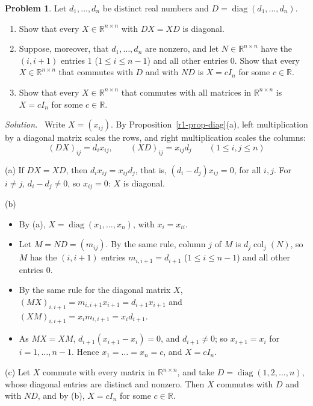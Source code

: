 \documentclass[12pt]{article}
\newcommand{\R}{\mathbb R}
\DeclareMathOperator{\col}{col}
\DeclareMathOperator{\diag}{diag}
\theoremstyle{definition}
\newtheorem{problem}{Problem}
\newenvironment{solution}{\par\noindent\textit{Solution.}\ }{\par\smallskip}
\begin{document}
\begin{problem}\label{r1-ex-pr-commute-diag}
Let \(d_1,\dots,d_n\) be distinct real numbers and \(D=\diag(d_1,\dots,d_n)\).
\begin{enumerate}
\item Show that every \(X\in\R^{n\times n}\) with \(DX=XD\) is diagonal.
\item Suppose, moreover, that \(d_1,\dots,d_n\) are nonzero, and let \(N\in\R^{n\times n}\) have the \((i,i+1)\) entries
\(1\) (\(1\leqslant i\leqslant n-1\)) and all other entries \(0\). Show that every \(X\in\R^{n\times n}\) that commutes
with \(D\) and with \(ND\) is \(X=cI_n\) for some \(c\in\R\).
\item Show that every \(X\in\R^{n\times n}\) that commutes with all matrices in \(\R^{n\times n}\) is \(X=cI_n\) for
some \(c\in\R\).
\end{enumerate}
\end{problem}
\begin{solution}
Write \(X=(x_{ij})\). By Proposition~\ref{r1-prop-diag}(a), left multiplication by a diagonal matrix scales the
rows, and right multiplication scales the columns:
\[
(DX)_{ij}=d_ix_{ij},\qquad (XD)_{ij}=x_{ij}d_j\qquad(1\leqslant i,j\leqslant n)
\]

(a) If \(DX=XD\), then \(d_ix_{ij}=x_{ij}d_j\), that is, \((d_i-d_j)x_{ij}=0\), for all \(i,j\). For \(i\ne j\),
\(d_i-d_j\ne0\), so \(x_{ij}=0\): \(X\) is diagonal.

(b)
\begin{itemize}
\item By (a), \(X=\diag(x_1,\dots,x_n)\), with \(x_i=x_{ii}\).
\item Let \(M=ND=(m_{ij})\). By the same rule, column \(j\) of \(M\) is \(d_j\col_j(N)\), so \(M\) has the
\((i,i+1)\) entries
\(m_{i,i+1}=d_{i+1}\) (\(1\leqslant i\leqslant n-1\)) and all other entries \(0\).
\item By the same rule for the diagonal matrix \(X\), \((MX)_{i,i+1}=m_{i,i+1}x_{i+1}=d_{i+1}x_{i+1}\) and
\((XM)_{i,i+1}=x_im_{i,i+1}=x_id_{i+1}\).
\item As \(MX=XM\), \(d_{i+1}(x_{i+1}-x_i)=0\), and \(d_{i+1}\ne0\); so \(x_{i+1}=x_i\) for \(i=1,\dots,n-1\). Hence
\(x_1=\dots=x_n=c\), and \(X=cI_n\).
\end{itemize}
(c) Let \(X\) commute with every matrix in \(\R^{n\times n}\), and take \(D=\diag(1,2,\dots,n)\), whose diagonal entries
are distinct and nonzero. Then \(X\) commutes with \(D\) and with \(ND\), and by (b), \(X=cI_n\) for some \(c\in\R\).
\end{solution}
\end{document}
